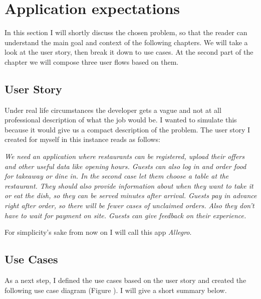 \chapter{Application expectations}\label{Ch1}
In this section I will shortly discuss the chosen problem, so that the reader can understand the main goal and context of the following chapters. We will take a look at the user story, then break it down to use cases. At the second part of the chapter we will compose three user flows based on them.
\section{User Story}

Under real life circumstances the developer gets a vague and not at all professional description of what the job would be. I wanted to simulate this because it would give us a compact description of the problem. The user story I created for myself in this instance reads as follows: 

 \emph{
 	We need an application where restaurants can be registered, upload their offers and other useful data like opening hours. Guests can also log in and order food for takeaway or dine in. In the second case let them choose a table at the restaurant. They should also provide information about when they want to take it or eat the dish, so they can be served minutes after arrival. Guests pay in advance right after order, so there will be fewer cases of unclaimed orders. Also they don't have to wait for payment on site. Guests can give feedback on their experience.
 } 

For simplicity's sake from now on I will call this app \emph{Allegro}.

\section{Use Cases}
 As a next step, I defined the use cases based on the user story and created the following use case diagram (Figure ). I will give a short summary below. 
 
